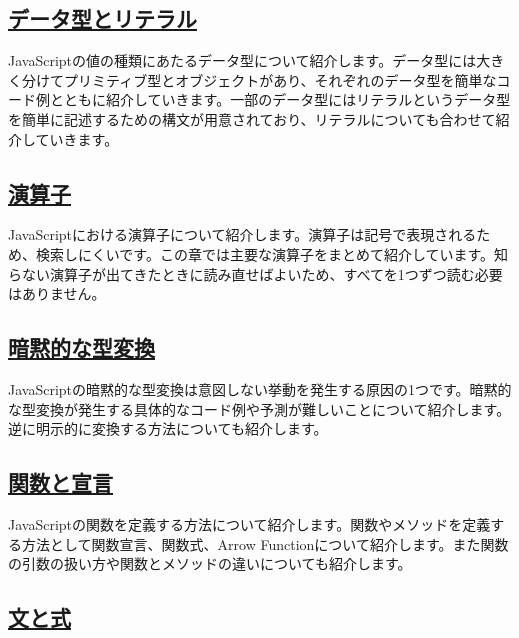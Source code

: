 \hypertarget{data-type}{%
\subsection*{\texorpdfstring{\href{./data-type/README.md}{データ型とリテラル}}{データ型とリテラル}}\label{data-type}}

JavaScriptの値の種類にあたるデータ型について紹介します。データ型には大きく分けてプリミティブ型とオブジェクトがあり、それぞれのデータ型を簡単なコード例とともに紹介していきます。一部のデータ型にはリテラルというデータ型を簡単に記述するための構文が用意されており、リテラルについても合わせて紹介していきます。

\hypertarget{operator}{%
\subsection*{\texorpdfstring{\href{./operator/README.md}{演算子}}{演算子}}\label{operator}}

JavaScriptにおける演算子について紹介します。演算子は記号で表現されるため、検索しにくいです。この章では主要な演算子をまとめて紹介しています。知らない演算子が出てきたときに読み直せばよいため、すべてを1つずつ読む必要はありません。

\hypertarget{implicit-coercion}{%
\subsection*{\texorpdfstring{\href{./implicit-coercion/README.md}{暗黙的な型変換}}{暗黙的な型変換}}\label{implicit-coercion}}

JavaScriptの暗黙的な型変換は意図しない挙動を発生する原因の1つです。暗黙的な型変換が発生する具体的なコード例や予測が難しいことについて紹介します。逆に明示的に変換する方法についても紹介します。

\hypertarget{function-declaration}{%
\subsection*{\texorpdfstring{\href{./function-declaration/README.md}{関数と宣言}}{関数と宣言}}\label{function-declaration}}

JavaScriptの関数を定義する方法について紹介します。関数やメソッドを定義する方法として関数宣言、関数式、Arrow
Functionについて紹介します。また関数の引数の扱い方や関数とメソッドの違いについても紹介します。

\hypertarget{statement-expression}{%
\subsection*{\texorpdfstring{\href{./statement-expression/README.md}{文と式}}{文と式}}\label{statement-expression}}

